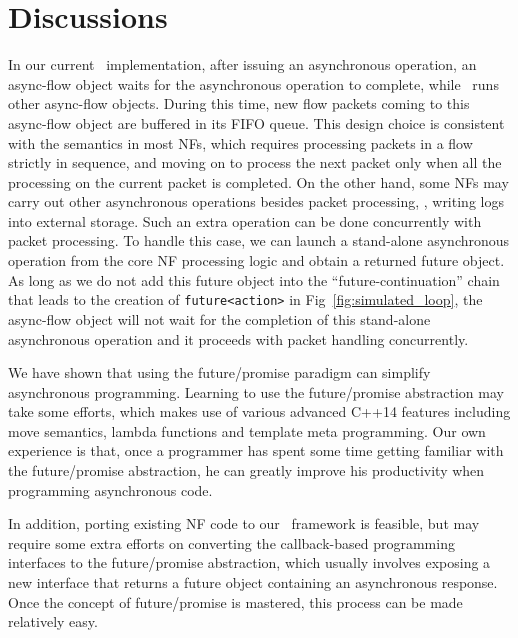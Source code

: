 \section{Discussions}
\label{sec:netstar-discussion}

In our current \netstar~implementation, after issuing an asynchronous operation, an async-flow object waits for the asynchronous operation to complete, while \netstar~runs other async-flow objects. During this time, new flow packets coming to this async-flow object are buffered in its FIFO queue. This design choice is consistent with the semantics in most NFs, which requires processing packets in a flow strictly in sequence, and moving on to process the next packet only when all the processing on the current packet is completed. On the other hand, some NFs may carry out other asynchronous operations besides packet processing, \eg, writing logs into external storage. Such an extra operation can be done concurrently with packet processing. To handle this case,
we can launch a stand-alone asynchronous operation from the core NF processing logic and obtain a returned future object. As long as we do not add this future object into the ``future-continuation'' chain that leads to the creation of \lstinline[style=InlineStyle]{future<action>} in Fig~\ref{fig:simulated_loop}, the async-flow object will not wait for the completion of this stand-alone asynchronous operation and it proceeds with packet handling concurrently.


We have shown that using the future/promise paradigm can simplify asynchronous programming. Learning to use the future/promise abstraction may take some efforts, which makes use of various advanced C++14 features including move semantics, lambda functions and template meta programming. Our own experience is that, once a programmer has spent some time getting familiar with the future/promise abstraction, he can greatly improve his productivity when programming asynchronous code.

In addition, porting existing NF code to our \netstar~framework is feasible, but may require some extra efforts on converting the callback-based programming interfaces to the future/promise abstraction, which usually involves exposing a new interface that returns a future object containing an asynchronous response. Once  the concept of future/promise is mastered, this process can be made relatively easy.


